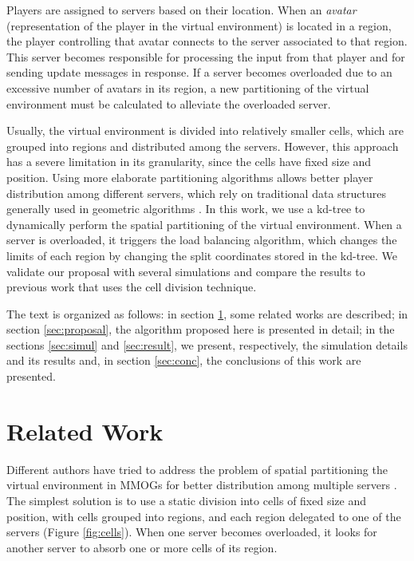 \documentclass[acmjacm]{acmtrans2m}
\begin{document}
Players are assigned to servers based on their location. When an \emph{avatar} (representation of the player in the virtual environment) is located in a region, the player controlling that avatar connects to the server associated to that region. This server becomes responsible for processing the input from that player and for sending update messages in response. If a server becomes overloaded due to an excessive number of avatars in its region, a new partitioning of the virtual environment must be calculated to alleviate the overloaded server.

Usually, the virtual environment is divided into relatively smaller cells, which are grouped into regions and distributed among the servers. However, this approach has a severe limitation in its granularity, since the cells have fixed size and position. Using more elaborate partitioning algorithms allows better player distribution among different servers, which rely on traditional data structures generally used in geometric algorithms \cite{samet2005}. In this work, we use a kd-tree to dynamically perform the spatial partitioning of the virtual environment. When a server is overloaded, it triggers the load balancing algorithm, which changes the limits of each region by changing the split coordinates stored in the kd-tree. We validate our proposal with several simulations and compare the results to previous work that uses the cell division technique.

The text is organized as follows: in section \ref{context}, some related works are described; in section \ref{sec:proposal}, the algorithm proposed here is presented in detail; in the sections \ref{sec:simul} and \ref{sec:result}, we present, respectively, the simulation details and its results and, in section \ref{sec:conc}, the conclusions of this work are presented.


\section{Related Work}
\label{context}

Different authors have tried to address the problem of spatial partitioning the virtual environment in MMOGs for better distribution among multiple servers \cite{ahmed2008mol,bezerra2009lbs}. The simplest solution is to use a static division into cells of fixed size and position, with cells grouped into regions, and each region delegated to one of the servers (Figure \ref{fig:cells}). When one server becomes overloaded, it looks for another server to absorb one or more cells of its region.
\end{document}
